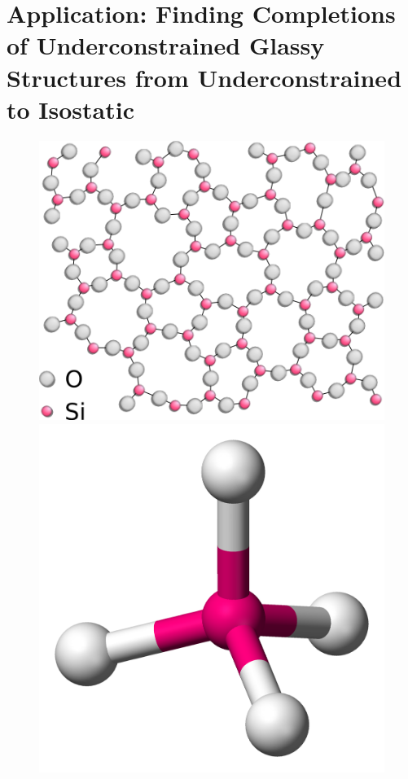 \section{Application: Finding Completions of Underconstrained Glassy Structures from Underconstrained to Isostatic}
\label{sec:bodypin}

% 



\ClearMyMinHeight
{}

\begin{figure}\centering
    \includegraphics[height=\myMinHeight]{../../img/Silica}
    \hspace{0.5cm}
    \includegraphics[height=\myMinHeight]{../../img/Silicon_tetrahedron}

\end{figure}
